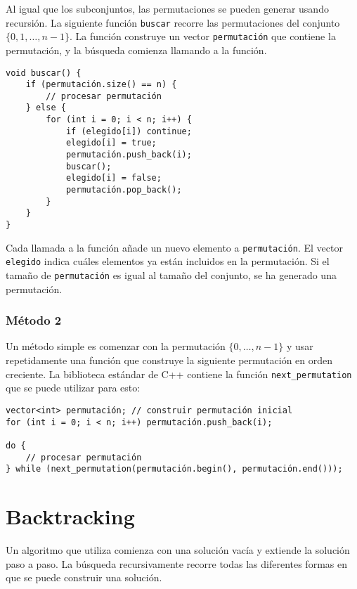 Al igual que los subconjuntos, las permutaciones se pueden generar
usando recursión.
La siguiente función \texttt{buscar} recorre
las permutaciones del conjunto $\{0,1,\ldots,n-1\}$.
La función construye un vector \texttt{permutación}
que contiene la permutación,
y la búsqueda comienza llamando a la función.

\begin{lstlisting}
void buscar() {
    if (permutación.size() == n) {
        // procesar permutación
    } else {
        for (int i = 0; i < n; i++) {
            if (elegido[i]) continue;
            elegido[i] = true;
            permutación.push_back(i);
            buscar();
            elegido[i] = false;
            permutación.pop_back();
        }
    }
}
\end{lstlisting}

Cada llamada a la función añade un nuevo elemento a
\texttt{permutación}.
El vector \texttt{elegido} indica cuáles
elementos ya están incluidos en la permutación.
Si el tamaño de \texttt{permutación} es igual al tamaño del conjunto,
se ha generado una permutación.

\subsubsection{Método 2}


Un método simple es comenzar con la permutación
$\{0,\ldots,n-1\}$ y usar repetidamente
una función que construye la siguiente permutación
en orden creciente.
La biblioteca estándar de C++ contiene la función
\texttt{next\_permutation} que se puede utilizar para esto:

\begin{lstlisting}
vector<int> permutación; // construir permutación inicial
for (int i = 0; i < n; i++) permutación.push_back(i);

do {
    // procesar permutación
} while (next_permutation(permutación.begin(), permutación.end()));
\end{lstlisting}

\section{Backtracking}


Un algoritmo que utiliza 
comienza con una solución vacía
y extiende la solución paso a paso.
La búsqueda recursivamente
recorre todas las diferentes formas en que
se puede construir una solución.

